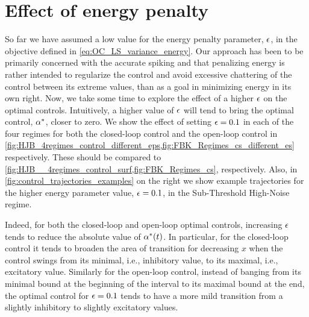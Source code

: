 \section{Effect of energy penalty}
\label{sec:effect_of_eps}
So far we have assumed a low value for the energy penalty parameter, ${\epsilon}$, in
the objective defined in \cref{eq:OC_LS_variance_energy}. Our approach has been
to be primarily concerned with the accurate spiking and that penalizing energy
is rather intended to regularize the control and avoid excessive chattering of
the control between its extreme values, than as a goal in minimizing energy in
its own right. Now, we take some time to explore the effect of a higher ${\epsilon}$
on the optimal controls. Intuitively, a higher value of ${\epsilon}$ will tend to
bring the optimal control, $\alpha^*$, closer to zero. We show the effect of setting
${\epsilon} = 0.1$ in each of the four regimes for both the closed-loop control and
the open-loop control in
\cref{fig:HJB_4regimes_control_different_eps,fig:FBK_Regimes_cs_different_es}
respectively. These should be compared to
\cref{fig:HJB__4regimes_control_surf,fig:FBK_Regimes_cs}, respectively.
Also, in \cref{fig:control_trajectories_examples} on the right we
show example trajectories for the higher energy parameter value, ${\epsilon}=0.1$, in
the Sub-Threshold High-Noise regime.

Indeed, for both the closed-loop and open-loop optimal controls, increasing
${\epsilon}$ tends to reduce the absolute value of $\alpha^*(t)$. In particular, for the
closed-loop control it tends to broaden the area of transition for decreasing
$x$ when the control swings from its minimal, i.e., inhibitory value, to its
maximal, i.e., excitatory value. Similarly for the open-loop control, instead of
banging from its minimal bound at the beginning of the interval to its maximal
bound at the end, the optimal control for ${\epsilon} = 0.1$ tends to have a more mild
transition from a slightly inhibitory to slightly excitatory values.
  
